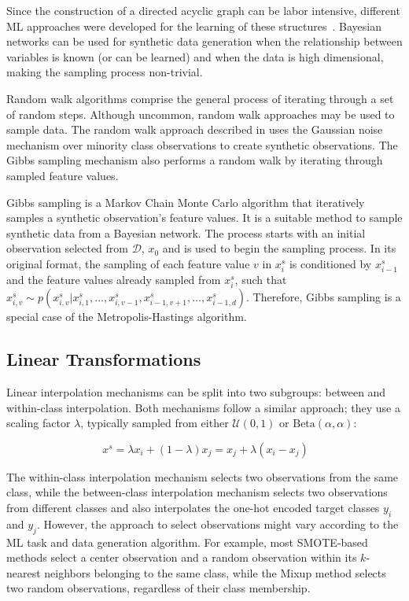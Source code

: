 \documentclass[parskip=full]{scrartcl}
\begin{document}
Since the construction of a directed acyclic graph can be labor intensive,
different ML approaches were developed for the learning of these
structures~\cite{yu2019dag}. Bayesian networks can be used for synthetic data
generation when the relationship between variables is known (or can be
learned) and when the data is high dimensional, making the sampling process
non-trivial.

Random walk algorithms comprise the general process of iterating through a set
of random steps. Although uncommon, random walk approaches may be used to
sample data. The random walk approach described in \citet{zhang2014rwo} uses
the Gaussian noise mechanism over minority class observations to create
synthetic observations. The Gibbs sampling mechanism also performs a random
walk by iterating through sampled feature values.

Gibbs sampling is a Markov Chain Monte Carlo algorithm that iteratively
samples a synthetic observation's feature values. It is a suitable method to
sample synthetic data from a Bayesian network. The process starts with an
initial observation selected from $\mathcal{D}$, $x_0$ and is used to begin
the sampling process. In its original format, the sampling of each feature
value $v$ in $x^s_i$ is conditioned by $x^s_{i-1}$ and the feature values
already sampled from $x^s_i$, such that $x^s_{i, v} \sim p(x^s_{i, v} |
x^s_{i, 1}, \ldots, x^s_{i, v-1}, x^s_{i-1, v+1}, \dots, x^s_{i-1, d})$.
Therefore, Gibbs sampling is a special case of the Metropolis-Hastings
algorithm.

\subsection{Linear Transformations}

Linear interpolation mechanisms can be split into two subgroups: between and
within-class interpolation. Both mechanisms follow a similar approach; they
use a scaling factor $\lambda$, typically sampled from either
$\mathcal{U}(0,1)$ or $\text{Beta}(\alpha, \alpha)$: 

\begin{equation}~\label{eq:interpolation}
    x^s = \lambda x_i + (1-\lambda)x_j = x_j + \lambda(x_i - x_j)
\end{equation}

The within-class interpolation mechanism selects two observations from the
same class, while the between-class interpolation mechanism selects two
observations from different classes and also interpolates the one-hot encoded
target classes $y_i$ and $y_j$. However, the approach to select observations
might vary according to the ML task and data generation algorithm. For
example, most SMOTE-based methods select a center observation and a random
observation within its $k$-nearest neighbors belonging to the same class,
while the Mixup method selects two random observations, regardless of their
class membership.
\end{document}
